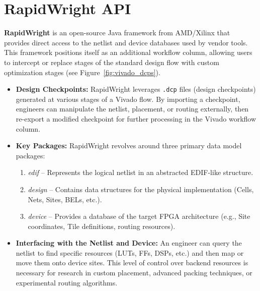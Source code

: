 \documentclass{article}
\begin{document}
\begin{multicols}{2}
\begin{enumerate}
    \end{enumerate}


\newpage
\section{RapidWright API}
    \label{sec:rapidwright_api}

    \textbf{RapidWright} is an open-source Java framework from AMD/Xilinx that provides direct access to the netlist and device databases used by vendor tools. 
    This framework positions itself as an additional workflow column, allowing users to intercept or replace stages of the standard design flow with custom optimization stages (see Figure~\ref{fig:vivado_dcps}).

    \begin{itemize}
    \item \textbf{Design Checkpoints:} 
        RapidWright leverages \texttt{.dcp} files (design checkpoints) generated at various stages of a Vivado flow. 
        By importing a checkpoint, engineers can manipulate the netlist, placement, or routing externally, then re-export a modified checkpoint for further processing in the Vivado workflow column.

    \item \textbf{Key Packages:} 
        RapidWright revolves around three primary data model packages:
        \begin{enumerate}
        \item \emph{edif} -- Represents the logical netlist in an abstracted EDIF-like structure.
        \item \emph{design} -- Contains data structures for the physical implementation (Cells, Nets, Sites, BELs, etc.).
        \item \emph{device} -- Provides a database of the target FPGA architecture (e.g., Site coordinates, Tile definitions, routing resources).
        \end{enumerate}

    \item \textbf{Interfacing with the Netlist and Device:} 
        An engineer can query the netlist to find specific resources (LUTs, FFs, DSPs, etc.) and then map or move them onto device sites. 
        This level of control over backend resources is necessary for research in custom placement, advanced packing techniques, or experimental routing algorithms.
    \end{itemize}


\end{multicols}
\end{document}
